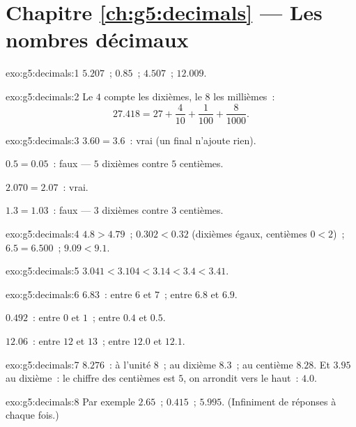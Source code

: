 \section*{Chapitre \ref{ch:g5:decimals} --- Les nombres décimaux}

\begin{solution}{exo:g5:decimals:1}
$5.207$~; \quad $0.85$~; \quad $4.507$~; \quad $12.009$.
\end{solution}

\begin{solution}{exo:g5:decimals:2}
Le $4$ compte les dixièmes, le $8$ les millièmes~:
\[
27.418 = 27 + \frac{4}{10} + \frac{1}{100} + \frac{8}{1000}.
\]
\end{solution}

\begin{solution}{exo:g5:decimals:3}
$3.60 = 3.6$~: vrai (un  final n'ajoute rien).

$0.5 = 0.05$~: faux --- $5$ dixièmes contre $5$ centièmes.

$2.070 = 2.07$~: vrai.

$1.3 = 1.03$~: faux --- $3$ dixièmes contre $3$ centièmes.
\end{solution}

\begin{solution}{exo:g5:decimals:4}
$4.8 > 4.79$~; \quad $0.302 < 0.32$ (dixièmes égaux, centièmes
$0 < 2$)~; \quad $6.5 = 6.500$~; \quad $9.09 < 9.1$.
\end{solution}

\begin{solution}{exo:g5:decimals:5}
$3.041 < 3.104 < 3.14 < 3.4 < 3.41$.
\end{solution}

\begin{solution}{exo:g5:decimals:6}
$6.83$~: entre $6$ et $7$~; entre $6.8$ et $6.9$.

$0.492$~: entre $0$ et $1$~; entre $0.4$ et $0.5$.

$12.06$~: entre $12$ et $13$~; entre $12.0$ et $12.1$.
\end{solution}

\begin{solution}{exo:g5:decimals:7}
$8.276$~: à l'unité $8$~; au dixième $8.3$~; au centième $8.28$.
Et $3.95$ au dixième~: le chiffre des centièmes est $5$, on
arrondit vers le haut~: $4.0$.
\end{solution}

\begin{solution}{exo:g5:decimals:8}
Par exemple $2.65$~; \quad $0.415$~; \quad $5.995$. (Infiniment de
réponses à chaque fois.)
\end{solution}

